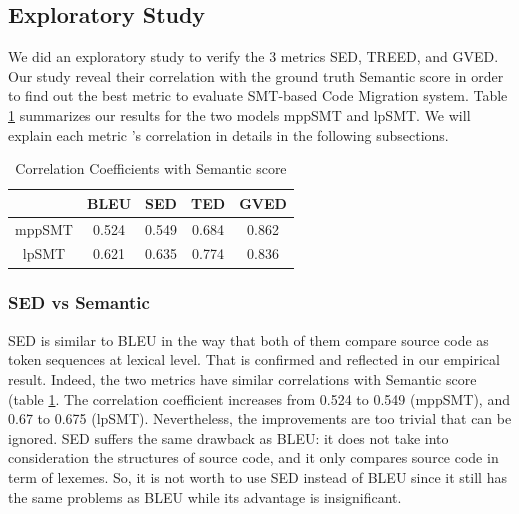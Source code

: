 \subsection{Exploratory Study}
We did an exploratory study to verify the 3 metrics SED, TREED, and GVED. Our study reveal their correlation with the ground truth Semantic score in order to find out the best metric to evaluate SMT-based Code Migration system. Table \ref{table:correlation} summarizes our results for the two models mppSMT and lpSMT. We will explain each metric \rq s correlation in details in the following subsections. 

\begin{table}
\caption{Correlation Coefficients with Semantic score}
\begin{tabular}{|c|c|c|c|c|}
\hline
& BLEU & SED & TED & GVED\\
\hline
mppSMT & 0.524 & 0.549 & 0.684 & 0.862 \\
lpSMT & 0.621 & 0.635 & 0.774 & 0.836 \\
\hline
\end{tabular}
\label{table:correlation}
\end{table}


\subsubsection{\textbf{SED vs Semantic}}
SED is similar to BLEU in the way that both of them compare source code as token sequences at lexical level. That is confirmed and reflected in our empirical result. Indeed, the two metrics have similar correlations with Semantic score (table \ref{table:correlation}. The correlation coefficient increases from 0.524 to 0.549 (mppSMT), and 0.67 to 0.675 (lpSMT). Nevertheless, the improvements are too trivial that can be ignored. SED suffers the same drawback as BLEU: it does not take into consideration the structures of source code, and it only compares source code in term of lexemes. 
So, it is not worth to use SED instead of BLEU since it still has the same problems as BLEU while its advantage is insignificant. 

%

